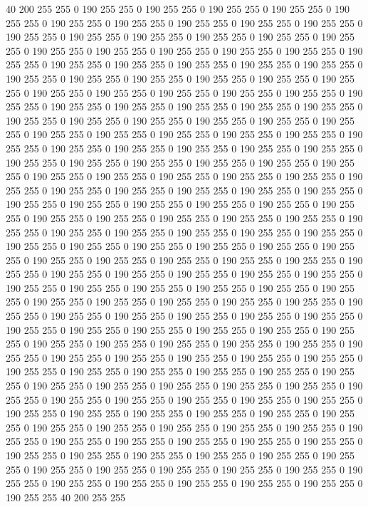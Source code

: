 40 200 255 255 0 190 255 255 0 190 255 255 0 190 255 255 0 190 255 255 0 190 255 255 0 190 255 255 0 190 255 255 0 190 255 255 0 190 255 255 0 190 255 255 0 190 255 255 0 190 255 255 0 190 255 255 0 190 255 255 0 190 255 255 0 190 255 255 0 190 255 255 0 190 255 255 0 190 255 255 0 190 255 255 0 190 255 255 0 190 255 255 0 190 255 255 0 190 255 255 0 190 255 255 0 190 255 255 0 190 255 255 0 190 255 255 0 190 255 255 0 190 255 255 0 190 255 255 0 190 255 255 0 190 255 255 0 190 255 255 0 190 255 255 0 190 255 255 0 190 255 255 0 190 255 255 0 190 255 255 0 190 255 255 0 190 255 255 0 190 255 255 0 190 255 255 0 190 255 255 0 190 255 255 0 190 255 255 0 190 255 255 0 190 255 255 0 190 255 255 
0 190 255 255 0 190 255 255 0 190 255 255 0 190 255 255 0 190 255 255 0 190 255 255 0 190 255 255 0 190 255 255 0 190 255 255 0 190 255 255 0 190 255 255 0 190 255 255 0 190 255 255 0 190 255 255 0 190 255 255 0 190 255 255 0 190 255 255 0 190 255 255 0 190 255 255 0 190 255 255 0 190 255 255 0 190 255 255 0 190 255 255 0 190 255 255 0 190 255 255 0 190 255 255 0 190 255 255 0 190 255 255 0 190 255 255 0 190 255 255 0 190 255 255 0 190 255 255 0 190 255 255 0 190 255 255 0 190 255 255 0 190 255 255 0 190 255 255 0 190 255 255 0 190 255 255 0 190 255 255 0 190 255 255 0 190 255 255 0 190 255 255 0 190 255 255 0 190 255 255 0 190 255 255 0 190 255 255 0 190 255 255 0 190 255 255 0 190 255 255 
0 190 255 255 0 190 255 255 0 190 255 255 0 190 255 255 0 190 255 255 0 190 255 255 0 190 255 255 0 190 255 255 0 190 255 255 0 190 255 255 0 190 255 255 0 190 255 255 0 190 255 255 0 190 255 255 0 190 255 255 0 190 255 255 0 190 255 255 0 190 255 255 0 190 255 255 0 190 255 255 0 190 255 255 0 190 255 255 0 190 255 255 0 190 255 255 0 190 255 255 0 190 255 255 0 190 255 255 0 190 255 255 0 190 255 255 0 190 255 255 0 190 255 255 0 190 255 255 0 190 255 255 0 190 255 255 0 190 255 255 0 190 255 255 0 190 255 255 0 190 255 255 0 190 255 255 0 190 255 255 0 190 255 255 0 190 255 255 0 190 255 255 0 190 255 255 0 190 255 255 0 190 255 255 0 190 255 255 0 190 255 255 0 190 255 255 0 190 255 255 
0 190 255 255 0 190 255 255 0 190 255 255 0 190 255 255 0 190 255 255 0 190 255 255 0 190 255 255 0 190 255 255 0 190 255 255 0 190 255 255 0 190 255 255 0 190 255 255 0 190 255 255 0 190 255 255 0 190 255 255 0 190 255 255 0 190 255 255 0 190 255 255 0 190 255 255 0 190 255 255 0 190 255 255 0 190 255 255 0 190 255 255 0 190 255 255 0 190 255 255 0 190 255 255 0 190 255 255 0 190 255 255 0 190 255 255 0 190 255 255 0 190 255 255 0 190 255 255 0 190 255 255 0 190 255 255 0 190 255 255 0 190 255 255 0 190 255 255 0 190 255 255 0 190 255 255 0 190 255 255 0 190 255 255 0 190 255 255 0 190 255 255 0 190 255 255 0 190 255 255 0 190 255 255 0 190 255 255 0 190 255 255 0 190 255 255 40 200 255 255 
